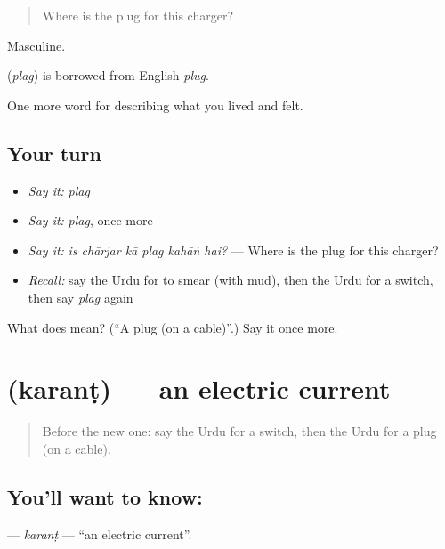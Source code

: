 \begin{quote}
Where is the plug for this charger?
\end{quote}

Masculine.

\begin{cousinweb}
\textbf{} (\emph{plag}) is borrowed from English \emph{plug}.
\end{cousinweb}

\begin{grammarlens}[title={What you've built}]
One more word for describing what you lived and felt.
\end{grammarlens}

\subsection*{Your turn}
\begin{itemize}
\raggedright
  \item \emph{Say it:} \emph{plag}
  \item \emph{Say it:} \emph{plag}, once more
  \item \emph{Say it:} \emph{is chārjar kā plag kahāṅ hai?} — Where is the plug for this charger?
  \item \emph{Recall:} say the Urdu for to smear (with mud), then the Urdu for a switch, then say \emph{plag} again
\end{itemize}

\begin{tcolorbox}[breakable,colback=teal!4,colframe=teal!35!black,title={Before you move on}]
What does  mean? (\textquotedblleft{}A plug (on a cable)\textquotedblright{}.) Say it once more.
\end{tcolorbox}
\section[\texorpdfstring{\ur{کرنٹ} (karanṭ)}{کرنٹ (karanṭ)}]{ (karanṭ) — an electric current}

\label{lesson:UR-C504-karant}



\begin{quote}
Before the new one: say the Urdu for a switch, then the Urdu for a plug (on a cable).
\end{quote}

\subsection*{You'll want to know: }
\textbf{} — \emph{karanṭ} — \textquotedblleft{}an electric current\textquotedblright{}.

